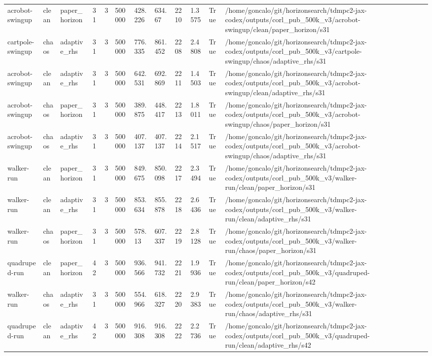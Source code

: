 \begin{tabular}{llllllllllll}
acrobot-swingup & clean & paper\_horizon & 31 & 3 & 500000 & 428.226 & 634.67 & 2210 & 1.3575 & True & /home/goncalo/git/horizonsearch/tdmpc2-jax-codex/outputs/corl\_pub\_500k\_v3/acrobot-swingup/clean/paper\_horizon/s31 \\
cartpole-swingup & chaos & adaptive\_rhs & 31 & 3 & 500000 & 776.335 & 861.452 & 2208 & 2.4808 & True & /home/goncalo/git/horizonsearch/tdmpc2-jax-codex/outputs/corl\_pub\_500k\_v3/cartpole-swingup/chaos/adaptive\_rhs/s31 \\
acrobot-swingup & clean & adaptive\_rhs & 31 & 3 & 500000 & 642.531 & 692.869 & 2211 & 1.4503 & True & /home/goncalo/git/horizonsearch/tdmpc2-jax-codex/outputs/corl\_pub\_500k\_v3/acrobot-swingup/clean/adaptive\_rhs/s31 \\
acrobot-swingup & chaos & paper\_horizon & 31 & 3 & 500000 & 389.875 & 448.417 & 2213 & 1.8011 & True & /home/goncalo/git/horizonsearch/tdmpc2-jax-codex/outputs/corl\_pub\_500k\_v3/acrobot-swingup/chaos/paper\_horizon/s31 \\
acrobot-swingup & chaos & adaptive\_rhs & 31 & 3 & 500000 & 407.137 & 407.137 & 2214 & 2.1517 & True & /home/goncalo/git/horizonsearch/tdmpc2-jax-codex/outputs/corl\_pub\_500k\_v3/acrobot-swingup/chaos/adaptive\_rhs/s31 \\
walker-run & clean & paper\_horizon & 31 & 3 & 500000 & 849.675 & 850.098 & 2217 & 2.3494 & True & /home/goncalo/git/horizonsearch/tdmpc2-jax-codex/outputs/corl\_pub\_500k\_v3/walker-run/clean/paper\_horizon/s31 \\
walker-run & clean & adaptive\_rhs & 31 & 3 & 500000 & 853.634 & 855.878 & 2218 & 2.6436 & True & /home/goncalo/git/horizonsearch/tdmpc2-jax-codex/outputs/corl\_pub\_500k\_v3/walker-run/clean/adaptive\_rhs/s31 \\
walker-run & chaos & paper\_horizon & 31 & 3 & 500000 & 578.13 & 607.337 & 2219 & 2.8128 & True & /home/goncalo/git/horizonsearch/tdmpc2-jax-codex/outputs/corl\_pub\_500k\_v3/walker-run/chaos/paper\_horizon/s31 \\
quadruped-run & clean & paper\_horizon & 42 & 3 & 500000 & 936.566 & 941.732 & 2221 & 1.9936 & True & /home/goncalo/git/horizonsearch/tdmpc2-jax-codex/outputs/corl\_pub\_500k\_v3/quadruped-run/clean/paper\_horizon/s42 \\
walker-run & chaos & adaptive\_rhs & 31 & 3 & 500000 & 554.966 & 618.327 & 2220 & 2.9383 & True & /home/goncalo/git/horizonsearch/tdmpc2-jax-codex/outputs/corl\_pub\_500k\_v3/walker-run/chaos/adaptive\_rhs/s31 \\
quadruped-run & clean & adaptive\_rhs & 42 & 3 & 500000 & 916.308 & 916.308 & 2222 & 2.2736 & True & /home/goncalo/git/horizonsearch/tdmpc2-jax-codex/outputs/corl\_pub\_500k\_v3/quadruped-run/clean/adaptive\_rhs/s42 \\

\end{tabular}
